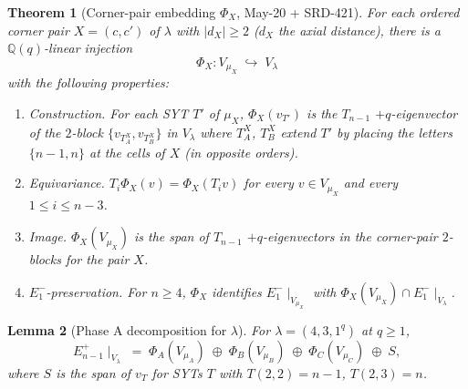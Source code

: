 \documentclass[11pt]{article}
\newtheorem{theorem}{Theorem}
\newtheorem{lemma}[theorem]{Lemma}
\theoremstyle{definition}
\begin{document}
\begin{theorem}[Corner-pair embedding $\Phi_X$, May-20 + SRD-421]\label{thm:Phi}
For each ordered corner pair $X = (c, c')$ of $\lambda$ with
$|d_X| \ge 2$ ($d_X$ the axial distance), there is a
$\mathbb{Q}(q)$-linear injection
\[
   \Phi_X : V_{\mu_X} \;\hookrightarrow\; V_\lambda
\]
with the following properties:
\begin{enumerate}[leftmargin=2em,topsep=0.2em,itemsep=0.1em]
\item \emph{Construction.} For each SYT $T'$ of $\mu_X$, $\Phi_X(v_{T'})$
is the $T_{n-1}$ $+q$-eigenvector of the $2$-block
$\{v_{T_A^X}, v_{T_B^X}\}$ in $V_\lambda$ where $T_A^X$, $T_B^X$
extend $T'$ by placing the letters $\{n-1, n\}$ at the cells of $X$
(in opposite orders).
\item \emph{Equivariance.} $T_i \Phi_X(v) = \Phi_X(T_i v)$ for every
$v \in V_{\mu_X}$ and every $1 \le i \le n - 3$.
\item \emph{Image.} $\Phi_X(V_{\mu_X})$ is the span of $T_{n-1}$
$+q$-eigenvectors in the corner-pair $2$-blocks for the pair $X$.
\item \emph{$E_1^-$-preservation.} For $n \ge 4$, $\Phi_X$ identifies
$E_1^-\!\mid_{V_{\mu_X}}$ with $\Phi_X(V_{\mu_X}) \cap E_1^-\!\mid_{V_\lambda}$.
\end{enumerate}
\end{theorem}

\begin{lemma}[Phase A decomposition for $\lambda$]\label{lem:phaseA-decomp}
For $\lambda = (4, 3, 1^q)$ at $q \ge 1$,
\begin{equation}\label{eq:phaseA-decomp}
   E_{n-1}^+\!\mid_{V_\lambda}
   \;=\;
   \Phi_A(V_{\mu_A}) \;\oplus\; \Phi_B(V_{\mu_B}) \;\oplus\;
   \Phi_C(V_{\mu_C}) \;\oplus\; S,
\end{equation}
where $S$ is the span of $v_T$ for SYTs $T$ with $T(2, 2) = n - 1$,
$T(2, 3) = n$.
\end{lemma}
\end{document}

